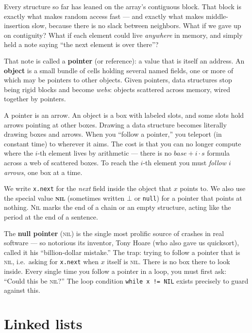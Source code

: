 Every structure so far has leaned on the array's contiguous block. That block is exactly what makes random access fast --- and exactly what makes middle-insertion slow, because there is no slack between neighbors. What if we gave up on contiguity? What if each element could live \emph{anywhere} in memory, and simply held a note saying ``the next element is over there''?

That note is called a \textbf{pointer} (or reference): a value that is itself an address. An \textbf{object} is a small bundle of cells holding several named fields, one or more of which may be pointers to other objects. Given pointers, data structures stop being rigid blocks and become \emph{webs}: objects scattered across memory, wired together by pointers.

\begin{intuitionbox}
A pointer is an arrow. An object is a box with labeled slots, and some slots hold arrows pointing at other boxes. Drawing a data structure becomes literally drawing boxes and arrows. When you ``follow a pointer,'' you teleport (in constant time) to wherever it aims. The cost is that you can no longer compute where the $i$-th element lives by arithmetic --- there is no $base + i\cdot s$ formula across a web of scattered boxes. To reach the $i$-th element you must \emph{follow $i$ arrows}, one box at a time.
\end{intuitionbox}

We write \lstinline|x.next| for the \emph{next} field inside the object that $x$ points to. We also use the special value \textbf{\textsc{nil}} (sometimes written $\bot$ or \texttt{null}) for a pointer that points at nothing. \textsc{Nil} marks the end of a chain or an empty structure, acting like the period at the end of a sentence.

\begin{trapbox}
The \textbf{null pointer} (\textsc{nil}) is the single most prolific source of crashes in real software --- so notorious its inventor, Tony Hoare (who also gave us quicksort), called it his ``billion-dollar mistake.'' The trap: trying to follow a pointer that is \textsc{nil}, i.e.\ asking for \lstinline|x.next| when $x$ itself is \textsc{nil}. There is no box there to look inside. Every single time you follow a pointer in a loop, you must first ask: ``Could this be \textsc{nil}?'' The loop condition \lstinline|while x != NIL| exists precisely to guard against this.
\end{trapbox}

\section{Linked lists}
\label{ch10:linked-list}

